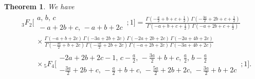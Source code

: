 \documentclass[12pt,reqno]{amsart}
\newtheorem{theorem}{Theorem}%
\let\Ga\Gamma
\begin{document}
\begin{theorem}
\label{th-pi2}
We have
\begin{align}
&
{} _{3} F _{2} \biggl[ \begin{matrix} a, \, b, \, c \\ \, -a+2 b+c, \, -a+b+2 c \end{matrix}\,; 1\biggr]
=\frac {\Ga(-\frac{a}{2}+b+c+\frac{1}{2})\, \Ga(-\frac{3 a}{2}+2 b+c+\frac{1}{2})}
{\Ga(-a+b+c+\frac{1}{2})\, \Ga(-a+2 b+c+\frac{1}{2})}
\nonumber\\ &\qquad\times
\frac { \Ga(-a+b+2 c)\, \Ga(-3 a+2 b+2 c) \,\Ga(-2 a+2 b+2 c) \,\Ga(-2 a+4 b+2 c)}
{\Ga(-\frac{3 a}{2}+b+2 c)\, \Ga(-\frac{5 a}{2}+2 b+2 c)\, \Ga(-a+2 b+2 c)\, \Ga(-3 a+4 b+2 c)}
\nonumber\\ &\qquad\times
 {}_5{F}_4 \biggl[ \begin{matrix} 
-2 a+2 b+2 c-1, \, c-\frac{a}{2}, \, -\frac{3 a}{2}+b+c, \, \frac{a}{2}, \, b-\frac{a}{2} \\[1.5pt]
 -\frac{3 a}{2}+2 b+c, \, -\frac{a}{2}+b+c, \, -\frac{5a}{2}+2 b+2 c, \, -\frac{3 a}{2}+b+2 c
\end{matrix}\, ; 1\biggr].
\label{eq:3F2-5F4}
\end{align}
\end{theorem}
\end{document}
